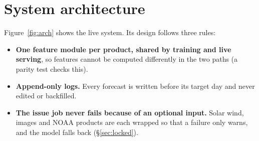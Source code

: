 \documentclass[11pt,a4paper]{article}
\begin{document}
\section{System architecture}
Figure~\ref{fig:arch} shows the live system. Its design follows three rules:
\begin{itemize}
\item \textbf{One feature module per product, shared by training and live serving}, so features cannot be computed
differently in the two paths (a parity test checks this).
\item \textbf{Append-only logs.} Every forecast is written before its target day and never edited or backfilled.
\item \textbf{The issue job never fails because of an optional input.} Solar wind, images and NOAA products are each
wrapped so that a failure only warns, and the model falls back (\S\ref{sec:locked}).
\end{itemize}
\end{document}
